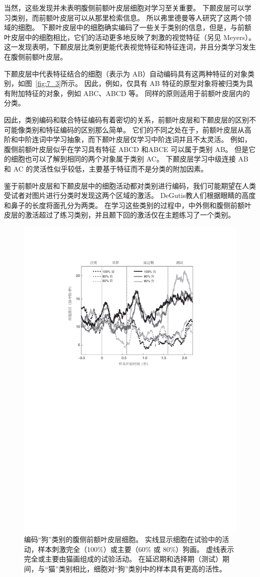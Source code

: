 当然，这些发现并未表明腹侧前额叶皮层细胞对学习至关重要。 
下颞皮层可以学习类别，而前额叶皮层可以从那里检索信息。 
所以弗里德曼等人\cite{freedman2003comparison}研究了这两个领域的细胞。 
下颞叶皮层中的细胞确实编码了一些关于类别的信息，但是，与前额叶皮层中的细胞相比，它们的活动更多地反映了刺激的视觉特征（另见 Meyers\cite{meyers2008dynamic}）。 
这一发现表明，下颞皮层比类别更能代表视觉特征和特征连词，并且分类学习发生在腹侧前额叶皮层。
\par

下颞皮层中代表特征结合的细胞（表示为 AB）自动编码具有这两种特征的对象类别，如图~\ref{fig:7_3}所示。
因此，例如，仅具有 AB 特征的原型对象将被归类为具有附加特征的对象，例如 ABC、ABCD 等。
同样的原则适用于前额叶皮层内的分类。
\par


因此，类别编码和联合特征编码有着密切的关系，前额叶皮层和下颞皮层的区别不可能像类别和特征编码的区别那么简单。 
它们的不同之处在于，前额叶皮层从高阶和中阶连词中学习抽象，而下颞叶皮层仅学习中阶连词并且不太灵活。
例如，腹侧前额叶皮层似乎在学习具有特征 ABCD 和ABCE 可以属于类别 AB。 
但是它的细胞也可以了解到相同的两个对象属于类别 AC。 
下颞皮层学习中级连接 AB 和 AC 的灵活性似乎较低，主要基于特征而不是分类的附加因素。
\par


鉴于前额叶皮层和下颞皮层中的细胞活动都对类别进行编码，我们可能期望在人类受试者对图片进行分类时发现这两个区域的激活。 
DeGutis\cite{degutis2009network}教人们根据眼睛的高度和鼻子的长度将面孔分为两类。 
在学习这些类别的过程中，中外侧和腹侧前额叶皮层的激活超过了练习类别，并且颞下回的激活仅在主题练习了一个类别。


\begin{figure}
	\centering
	\includegraphics[width=0.62\linewidth]{chap7/7_6}
	\caption{编码“狗”类别的腹侧前额叶皮层细胞。
		实线显示细胞在试验中的活动，样本刺激完全（100\%）或主要（60\% 或 80\%）狗画。
		虚线表示完全或主要由猫画组成的试验活动。
		在延迟期和选择期（测试）期间，与“猫”类别相比，细胞对“狗”类别中的样本具有更高的活性\cite{freedman2002visual}。\label{fig:7_6}}
\end{figure}
\par


